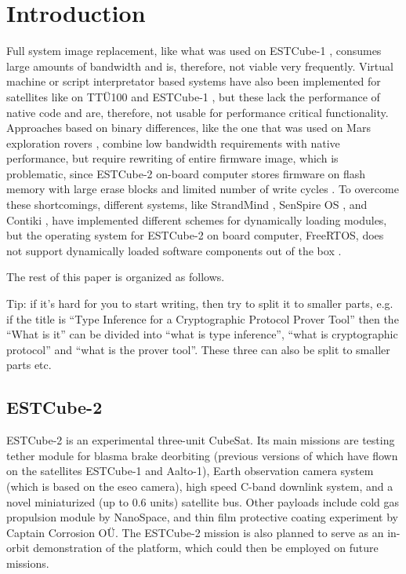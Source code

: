 \newpage
\section{Introduction}

Full system image replacement, like what was used on ESTCube-1 \cite{Tarbe2013,Suenter2016}, consumes large amounts of bandwidth and is, therefore, not viable very frequently. Virtual machine or script interpretator based systems have also been implemented for satellites like on TTÜ100 \cite{Aasavaeli2017} and ESTCube-1 \cite{Ehrpais2016}, but these lack the performance of native code and are, therefore, not usable for performance critical functionality. Approaches based on binary differences, like the one that was used on Mars exploration rovers \cite{Greco2005}, combine low bandwidth requirements with native performance, but require rewriting of entire firmware image, which is problematic, since ESTCube-2 on-board computer stores firmware on flash memory with large erase blocks and limited number of write cycles \cite{Haljaste2017}. To overcome these shortcomings, different systems, like StrandMind \cite{Bridges2013}, SenSpire OS \cite{Dong2009}, and Contiki \cite{Dunkels2006}, have implemented different schemes for dynamically loading modules, but the operating system for ESTCube-2 on board computer, FreeRTOS, does not support dynamically loaded software components out of the box \cite{Barry2005}. 


The rest of this paper is organized as follows.

Tip: if it's hard for you to start writing, then try to split it to smaller parts, e.g. if the title is ``Type Inference for a Cryptographic Protocol Prover Tool'' then the ``What is it'' can be divided into ``what is type inference'', ``what is cryptographic protocol'' and ``what is the prover tool''. These three can also be split to smaller parts etc.

\subsection{ESTCube-2}

ESTCube-2 is an experimental three-unit CubeSat. Its main missions are testing tether module for blasma brake deorbiting (previous versions of which have flown on the satellites ESTCube-1 and Aalto-1), Earth observation camera system (which is based on the \gls{eseo} camera), high speed C-band downlink system, and a novel miniaturized (up to 0.6 units) satellite bus. Other payloads include cold gas propulsion module by NanoSpace, and thin film protective coating experiment by Captain Corrosion OÜ. The ESTCube-2 mission is also planned to serve as an in-orbit demonstration of the platform, which could then be employed on future missions. \cite{Iakubivskyi2016}

